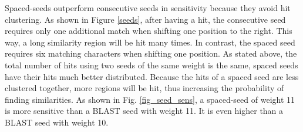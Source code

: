Spaced-seeds outperform consecutive seeds in sensitivity because they avoid hit clustering. As shown in Figure \ref{seeds}, after having a hit, the consecutive seed requires only one additional match when shifting one position to the right. This way, a long similarity region will be hit many times. In contrast, the spaced seed requires six matching characters when shifting one position. As stated above, the total number of hits using two seeds of the same weight is the same, spaced seeds have their hits much better distributed.  Because the hits of a spaced seed are less clustered together, more regions will be hit, thus increasing the probability of finding similarities. As shown in Fig. \ref{fig_seed_sens}, a spaced-seed of weight 11 is more sensitive than a BLAST seed with weight 11. It  is even higher than a BLAST seed with weight 10.
\begin{figure}[h!]
\begin{center}
\setlength{\tabcolsep}{2pt}
\end{center}
\end{figure}
